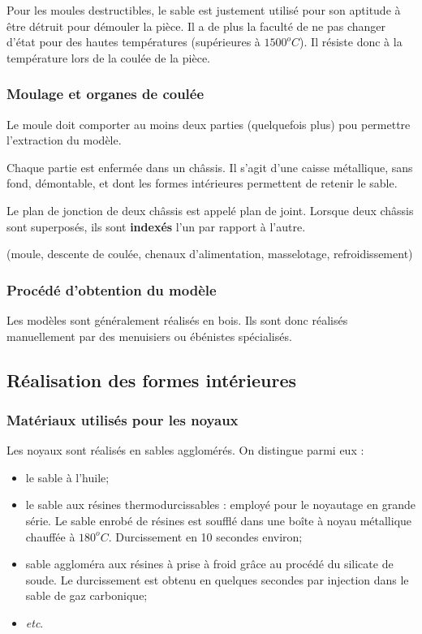 \documentclass[11pt,oneside]{article}
\begin{document}
Pour les moules destructibles, le sable est justement utilisé pour son aptitude
à être détruit pour démouler la pièce. Il a de plus la faculté de ne pas
changer d'état pour des hautes températures (supérieures à $1500^oC$). Il
résiste donc à la température lors de la coulée de la pièce.

\subsubsection{Moulage et organes de coulée}
Le moule doit comporter au moins deux parties (quelquefois plus) pou permettre
l'extraction du modèle. 

Chaque partie est enfermée dans un châssis. Il s'agit d'une caisse métallique,
sans fond, démontable, et dont les formes intérieures permettent de retenir le
sable. 

Le plan de jonction de deux châssis est appelé plan de joint. Lorsque deux
châssis sont superposés, ils sont \textbf{indexés} l'un par rapport à l'autre.



(moule, descente de coulée,
chenaux d’alimentation, masselotage, refroidissement)

\subsubsection{Procédé d'obtention du modèle}
Les modèles sont généralement réalisés en bois. Ils sont donc réalisés
manuellement par des menuisiers ou ébénistes spécialisés.

\subsection{Réalisation des formes intérieures}

\subsubsection{Matériaux utilisés pour les noyaux}
Les noyaux sont réalisés en sables agglomérés. On distingue parmi eux :
\begin{itemize}
 \item le sable à l'huile;
\item le sable aux résines thermodurcissables : employé pour le noyautage en
grande série. Le sable enrobé de résines est soufflé dans une boîte à noyau
métallique chauffée à $180^oC$. Durcissement en 10 secondes environ;
\item sable aggloméra aux résines à prise à froid grâce au procédé du silicate
de soude. Le durcissement est obtenu en quelques secondes par injection dans le
sable de gaz carbonique;
\item \textit{etc}.
\end{itemize}
\end{document}
